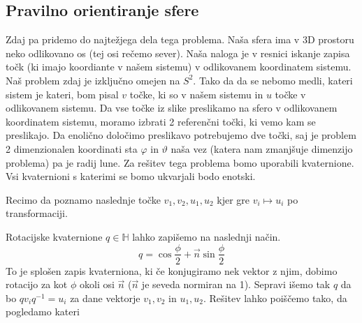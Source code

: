 \documentclass{article}
\begin{document}
\subsection{Pravilno orientiranje sfere}
Zdaj pa pridemo do najtežjega dela tega problema. Naša sfera ima v 3D prostoru neko odlikovano os (tej osi 
rečemo sever). Naša naloga je v resnici iskanje zapisa točk (ki imajo koordiante v našem sistemu) v 
odlikovanem koordinatem sistemu. Naš problem zdaj je izključno omejen na $S^2$. Tako da da se nebomo medli,
kateri sistem je kateri, bom pisal $v$ točke, ki so v našem sistemu in $u$ točke v odlikovanem sistemu. 
Da vse točke iz slike preslikamo na sfero v odlikovanem koordinatem sistemu, moramo izbrati 2 referenčni točki, 
ki vemo kam se preslikajo. Da enolično določimo preslikavo potrebujemo dve točki, saj je problem 2 dimenzionalen
koordinati sta $\varphi$ in $\vartheta$ naša vez (katera nam zmanjšuje dimenzijo problema) pa je radij lune.
Za rešitev tega problema bomo uporabili kvaternione. Vsi kvaternioni s katerimi se bomo ukvarjali bodo enotski.


Recimo da poznamo naslednje točke $v_{1}, v_{2}, u_{1}, u_{2}$ kjer gre $v_i \mapsto u_i$ po transformaciji.

Rotacijske kvaternione $q \in \mathbb{H}$ lahko zapišemo na naslednji način.
\begin{equation}
	q = \cos \frac{\phi}{2} + \vec{n} \sin\frac{\phi}{2}
	\label{eq:rot_quat}
\end{equation}
To je splošen zapis kvaterniona, ki če konjugiramo nek vektor z njim, dobimo rotacijo za kot $\phi$ okoli osi
$\vec{n}$ ($\vec{n}$ je seveda normiran na 1). Sepravi išemo tak $q$ da bo $q v_i q^{-1} = u_i$ za dane vektorje
$v_1, v_2$ in $u_1, u_2$. Rešitev lahko poiščemo tako, da pogledamo kateri
\end{document}
